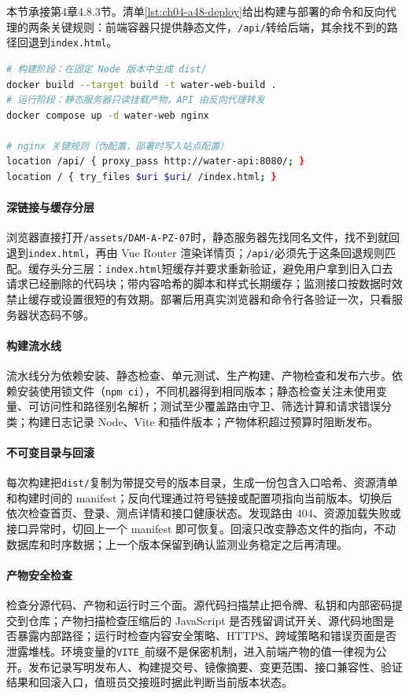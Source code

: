 本节承接第4章4.8.3节。清单\ref{lst:ch04-a48-deploy}给出构建与部署的命令和反向代理的两条关键规则：前端容器只提供静态文件，\texttt{/api/}转给后端，其余找不到的路径回退到\texttt{index.html}。

\begin{lstlisting}[label={lst:ch04-a48-deploy},language=bash,caption={Vite 产物与 Docker Compose 部署契约}]
# 构建阶段：在固定 Node 版本中生成 dist/
docker build --target build -t water-web-build .
# 运行阶段：静态服务器只读挂载产物，API 由反向代理转发
docker compose up -d water-web nginx

# nginx 关键规则（伪配置，部署时写入站点配置）
location /api/ { proxy_pass http://water-api:8080/; }
location / { try_files $uri $uri/ /index.html; }
\end{lstlisting}

\paragraph{深链接与缓存分层}浏览器直接打开\texttt{/assets/DAM-A-PZ-07}时，静态服务器先找同名文件，找不到就回退到\texttt{index.html}，再由 Vue Router 渲染详情页；\texttt{/api/}必须先于这条回退规则匹配。缓存头分三层：\texttt{index.html}短缓存并要求重新验证，避免用户拿到旧入口去请求已经删除的代码块；带内容哈希的脚本和样式长期缓存；监测接口按数据时效禁止缓存或设置很短的有效期。部署后用真实浏览器和命令行各验证一次，只看服务器状态码不够。

\paragraph{构建流水线}流水线分为依赖安装、静态检查、单元测试、生产构建、产物检查和发布六步。依赖安装使用锁文件（\texttt{npm ci}），不同机器得到相同版本；静态检查关注未使用变量、可访问性和路径别名解析；测试至少覆盖路由守卫、筛选计算和请求错误分类；构建日志记录 Node、Vite 和插件版本；产物体积超过预算时阻断发布。

\paragraph{不可变目录与回滚}每次构建把\texttt{dist/}复制为带提交号的版本目录，生成一份包含入口哈希、资源清单和构建时间的 manifest；反向代理通过符号链接或配置项指向当前版本。切换后依次检查首页、登录、测点详情和接口健康状态。发现路由 404、资源加载失败或接口异常时，切回上一个 manifest 即可恢复。回滚只改变静态文件的指向，不动数据库和时序数据；上一个版本保留到确认监测业务稳定之后再清理。

\paragraph{产物安全检查}检查分源代码、产物和运行时三个面。源代码扫描禁止把令牌、私钥和内部密码提交到仓库；产物扫描检查压缩后的 JavaScript 是否残留调试开关、源代码地图是否暴露内部路径；运行时检查内容安全策略、HTTPS、跨域策略和错误页面是否泄露堆栈。环境变量的\texttt{VITE\_}前缀不是保密机制，进入前端产物的值一律视为公开。发布记录写明发布人、构建提交号、镜像摘要、变更范围、接口兼容性、验证结果和回滚入口，值班员交接班时据此判断当前版本状态。




